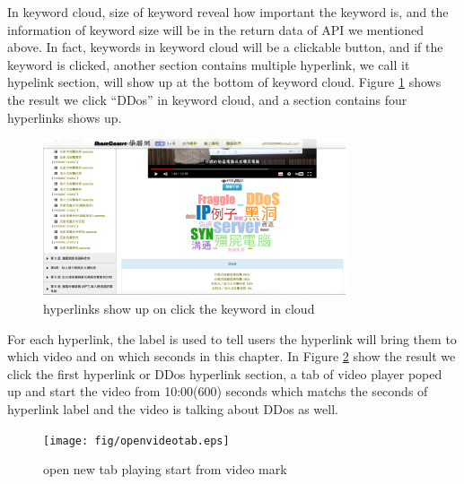 In keyword cloud, size of keyword reveal how important the keyword is, and the information of keyword size will be in the return data of API we mentioned above.
In fact, keywords in keyword cloud will be a clickable button, and if the keyword is clicked, another section contains multiple hyperlink, we call it hypelink section, will show up at the bottom of keyword cloud.
Figure \ref{fig:keywordurl} shows the result we click ``DDos'' in keyword cloud, and a section contains four hyperlinks shows up.
\begin{figure}[H]
    \centering
    \includegraphics[width = 0.8\textwidth]{fig/keywordurl.eps}
    \caption{hyperlinks show up on click the keyword in cloud}
    \label{fig:keywordurl}
\end{figure}

For each hyperlink, the label is used to tell users the hyperlink will bring them to which video and on which seconds in this chapter.
In Figure \ref{fig:openvideotab} show the result we click the first hyperlink or DDos hyperlink section, a tab of video player poped up and start the video from 10:00(600) seconds which matchs the seconds of hyperlink label and the video is talking about DDos as well.

\begin{figure}[H]
    \centering
    \texttt{[image: fig/openvideotab.eps]}
    \caption{open new tab playing start from video mark}
    \label{fig:openvideotab}
\end{figure}
